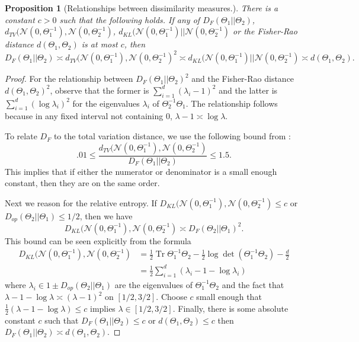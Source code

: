 \documentclass[aos]{imsart}
\newtheorem{prop}[theorem]{Proposition}
\theoremstyle{definition}
\numberwithin{equation}{section}
\DeclareMathOperator{\tr}{Tr}
\begin{document}
\begin{appendix}
\begin{prop}[Relationships between dissimilarity measures.]\label{prop:dissimilarities} There is a constant $c > 0$ such that the following holds. If any of $D_F(\Theta_1|| \Theta_2)$, $d_{TV}(\mathcal{N}(0, \Theta_1^{-1}), \mathcal{N}(0, \Theta_2^{-1})$, $d_{KL}(\mathcal{N}(0, \Theta_1^{-1}) || \mathcal{N}(0, \Theta_2^{-1})$ or the Fisher-Rao distance $d(\Theta_1, \Theta_2)$ is at most $c$, then 
$$ D_F(\Theta_1|| \Theta_2) \asymp  d_{TV}(\mathcal{N}(0, \Theta_1^{-1}), \mathcal{N}(0, \Theta_2^{-1})^2 \asymp d_{KL}(\mathcal{N}(0, \Theta_1^{-1}) || \mathcal{N}(0, \Theta_2^{-1}) \asymp d(\Theta_1, \Theta_2).$$
\end{prop}
\begin{proof}
For the relationship between $D_F(\Theta_1|| \Theta_2)^2$ and the Fisher-Rao distance $d(\Theta_1, \Theta_2)^2$, observe that the former is $\sum_{i = 1}^d (\lambda_i - 1)^2$ and the latter is $\sum_{i = 1}^d (\log \lambda_i)^2$ for the eigenvalues $\lambda_i$ of $\Theta_2^{-1} \Theta_1$. The relationship follows because in any fixed interval not containing $0$, $\lambda-1 \asymp \log \lambda$.

To relate $D_F$ to the total variation distance, we use the following bound from \cite{devroye2018total}:
$$.01  \leq \frac{d_{TV}(\mathcal{N}(0, \Theta_1^{-1}), \mathcal{N}(0, \Theta_2^{-1})}{D_F(\Theta_1 || \Theta_2)} \leq 1.5.$$ 
This implies that if either the numerator or denominator is a small enough constant, then they are on the same order. 

Next we reason for the relative entropy. If $D_{KL}(\mathcal{N}(0, \Theta_1^{-1}), \mathcal{N}(0, \Theta_2^{-1}) \leq c$ or $D_{op}(\Theta_2 || \Theta_1) \leq 1/2$, then we have 
$$D_{KL}(\mathcal{N}(0, \Theta_1^{-1}), \mathcal{N}(0, \Theta_2^{-1})  \asymp D_{F}(\Theta_2 || \Theta_1)^2.$$ This bound can be seen explicitly from the formula 
\begin{align*}D_{KL}(\mathcal{N}(0, \Theta_1^{-1}), \mathcal{N}(0, \Theta_2^{-1}) &= \frac{1}{2} \tr \Theta_1^{-1} \Theta_2 - \frac{1}{2}\log\det(\Theta_1^{-1} \Theta_2) - \frac{d}{2}\\
& = \frac{1}{2} \sum_{i =1}^d (\lambda_i -1 -  \log \lambda_i)
\end{align*}
 where $\lambda_i \in 1 \pm D_{op}(\Theta_2||\Theta_1)$ are the eigenvalues of $\Theta_1^{-1} \Theta_2$ and the fact that $\lambda - 1 -\log\lambda \asymp  (\lambda - 1)^2$ on $[1/2, 3/2]$. Choose $c$ small enough that $\frac{1}{2}(\lambda - 1 -\log\lambda) \leq c $ implies $\lambda \in [1/2, 3/2]$. Finally, there is some absolute constant $c$ such that $D_F(\Theta_1 || \Theta_2) \leq c$ or $d(\Theta_1, \Theta_2) \leq c$ then $D_F(\Theta_1 || \Theta_2) \asymp d(\Theta_1, \Theta_2)$.\end{proof}
\end{appendix}
\end{document}
